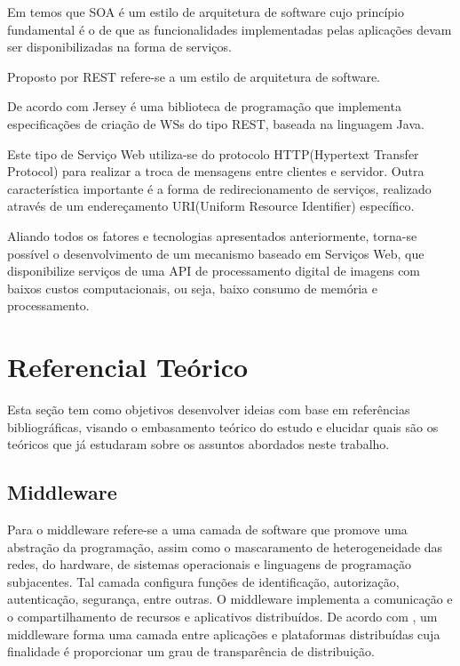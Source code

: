 \documentclass[12pt]{article}
\begin{document}
Em \cite{soa1,soa2} temos que SOA é um estilo de arquitetura de software cujo princípio fundamental é o de que as funcionalidades implementadas pelas aplicações devam ser disponibilizadas na forma de serviços.

Proposto por \cite{rest} REST refere-se a um estilo de arquitetura de software.

De acordo com \cite{jersey} Jersey é uma biblioteca de programação que implementa especificações de criação de WSs do tipo REST, baseada na linguagem Java.

Este tipo de Serviço Web utiliza-se do protocolo HTTP(Hypertext Transfer Protocol) para realizar a troca
de mensagens entre clientes e servidor. Outra característica importante é a forma de
redirecionamento de serviços, realizado através de um endereçamento URI(Uniform Resource Identifier)
específico.

Aliando todos os fatores e tecnologias apresentados anteriormente, torna-se
possível o desenvolvimento de um mecanismo baseado em Serviços Web, que disponibilize serviços de uma API de processamento digital de imagens
com baixos custos computacionais, ou seja, baixo consumo de memória e processamento.

\section{Referencial Teórico} \label{sec:firstpage}

Esta seção tem como objetivos desenvolver ideias com base em referências bibliográficas, visando o embasamento teórico do estudo e elucidar quais são os teóricos que já estudaram sobre os assuntos abordados neste trabalho.

\subsection{Middleware}

Para \cite{coulouris:05} o middleware refere-se a uma camada de software
que promove uma abstração da programação, assim como o mascaramento de
heterogeneidade das redes, do hardware, de sistemas operacionais e linguagens de
programação subjacentes. Tal camada configura funções de identificação, autorização,
autenticação, segurança, entre outras. O middleware implementa a comunicação e o
compartilhamento de recursos e aplicativos distribuídos.
De acordo com \cite{tanenbaum:07}, um middleware forma uma camada entre aplicações e plataformas distribuídas
cuja finalidade é proporcionar um grau de transparência de distribuição. 
\end{document}
